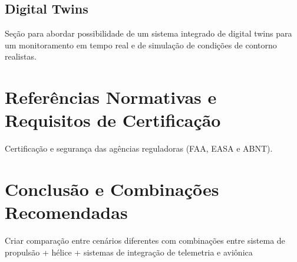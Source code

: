 \documentclass[a4paper,12pt]{article}
\begin{document}
\subsection{Digital Twins}

Seção para abordar possibilidade de um sistema integrado de digital twins para um monitoramento em tempo real e de simulação de condições de contorno realistas. 

\section{Referências Normativas e Requisitos de Certificação}

Certificação e segurança das agências reguladoras (FAA, EASA e ABNT).

\section{Conclusão e Combinações Recomendadas}

Criar comparação entre cenários diferentes com combinações entre sistema de propulsão + hélice + sistemas de integração de telemetria e aviônica

\newpage
\end{document}
